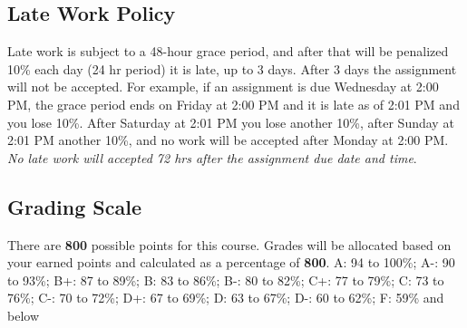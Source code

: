 \hypertarget{late-work-policy}{%
\subsection{Late Work Policy}\label{late-work-policy}}

Late work is subject to a 48-hour grace period, and after that will be
penalized 10\% each day (24 hr period) it is late, up to 3 days. After 3
days the assignment will not be accepted. For example, if an assignment
is due Wednesday at 2:00 PM, the grace period ends on Friday at 2:00 PM
and it is late as of 2:01 PM and you lose 10\%. After Saturday at 2:01
PM you lose another 10\%, after Sunday at 2:01 PM another 10\%, and no
work will be accepted after Monday at 2:00 PM. \emph{No late work will
accepted 72 hrs after the assignment due date and time}.

\hypertarget{grading-scale}{%
\subsection{Grading Scale}\label{grading-scale}}

There are \textbf{800} possible points for this course. Grades will be
allocated based on your earned points and calculated as a percentage of
\textbf{800}. A: 94 to 100\%; A-: 90 to 93\%; B+: 87 to 89\%; B: 83 to
86\%; B-: 80 to 82\%; C+: 77 to 79\%; C: 73 to 76\%; C-: 70 to 72\%; D+:
67 to 69\%; D: 63 to 67\%; D-: 60 to 62\%; F: 59\% and below
